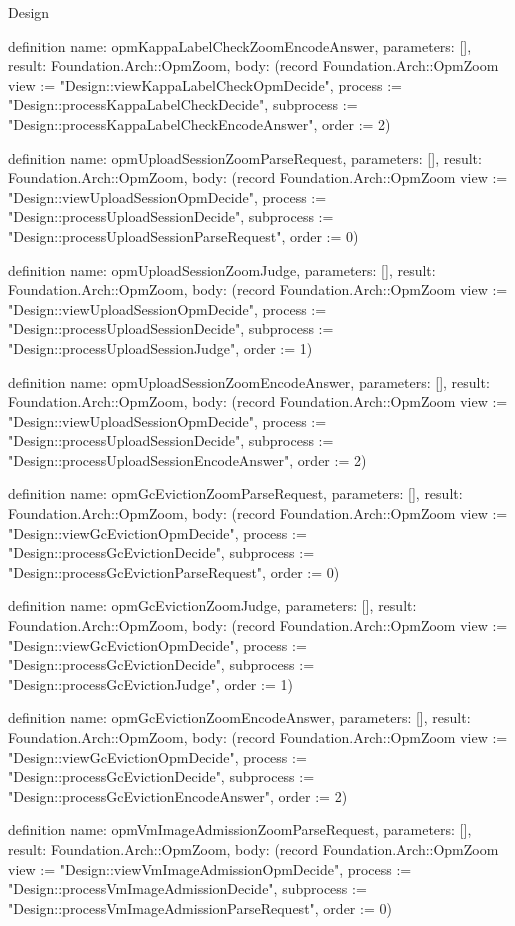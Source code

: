 \begin{lexlean}{Design}
\begin{semanticmodule}
definition{
  name: opmKappaLabelCheckZoomEncodeAnswer,
  parameters: [],
  result: Foundation.Arch::OpmZoom,
  body: (record Foundation.Arch::OpmZoom {view := "Design::viewKappaLabelCheckOpmDecide", process := "Design::processKappaLabelCheckDecide", subprocess := "Design::processKappaLabelCheckEncodeAnswer", order := 2})
}

definition{
  name: opmUploadSessionZoomParseRequest,
  parameters: [],
  result: Foundation.Arch::OpmZoom,
  body: (record Foundation.Arch::OpmZoom {view := "Design::viewUploadSessionOpmDecide", process := "Design::processUploadSessionDecide", subprocess := "Design::processUploadSessionParseRequest", order := 0})
}

definition{
  name: opmUploadSessionZoomJudge,
  parameters: [],
  result: Foundation.Arch::OpmZoom,
  body: (record Foundation.Arch::OpmZoom {view := "Design::viewUploadSessionOpmDecide", process := "Design::processUploadSessionDecide", subprocess := "Design::processUploadSessionJudge", order := 1})
}

definition{
  name: opmUploadSessionZoomEncodeAnswer,
  parameters: [],
  result: Foundation.Arch::OpmZoom,
  body: (record Foundation.Arch::OpmZoom {view := "Design::viewUploadSessionOpmDecide", process := "Design::processUploadSessionDecide", subprocess := "Design::processUploadSessionEncodeAnswer", order := 2})
}

definition{
  name: opmGcEvictionZoomParseRequest,
  parameters: [],
  result: Foundation.Arch::OpmZoom,
  body: (record Foundation.Arch::OpmZoom {view := "Design::viewGcEvictionOpmDecide", process := "Design::processGcEvictionDecide", subprocess := "Design::processGcEvictionParseRequest", order := 0})
}

definition{
  name: opmGcEvictionZoomJudge,
  parameters: [],
  result: Foundation.Arch::OpmZoom,
  body: (record Foundation.Arch::OpmZoom {view := "Design::viewGcEvictionOpmDecide", process := "Design::processGcEvictionDecide", subprocess := "Design::processGcEvictionJudge", order := 1})
}

definition{
  name: opmGcEvictionZoomEncodeAnswer,
  parameters: [],
  result: Foundation.Arch::OpmZoom,
  body: (record Foundation.Arch::OpmZoom {view := "Design::viewGcEvictionOpmDecide", process := "Design::processGcEvictionDecide", subprocess := "Design::processGcEvictionEncodeAnswer", order := 2})
}

definition{
  name: opmVmImageAdmissionZoomParseRequest,
  parameters: [],
  result: Foundation.Arch::OpmZoom,
  body: (record Foundation.Arch::OpmZoom {view := "Design::viewVmImageAdmissionOpmDecide", process := "Design::processVmImageAdmissionDecide", subprocess := "Design::processVmImageAdmissionParseRequest", order := 0})
}


\end{semanticmodule}
\end{lexlean}
